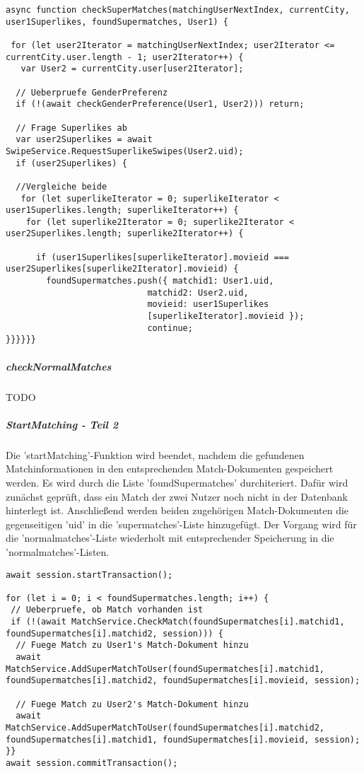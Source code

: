 \begin{lstlisting}[caption=matchManager.js - checkSuperMatches, label=lst:checkSuperMatches]
async function checkSuperMatches(matchingUserNextIndex, currentCity, user1Superlikes, foundSupermatches, User1) {

 for (let user2Iterator = matchingUserNextIndex; user2Iterator <= currentCity.user.length - 1; user2Iterator++) {
   var User2 = currentCity.user[user2Iterator];
   
  // Ueberpruefe GenderPreferenz
  if (!(await checkGenderPreference(User1, User2))) return;
  
  // Frage Superlikes ab
  var user2Superlikes = await SwipeService.RequestSuperlikeSwipes(User2.uid);
  if (user2Superlikes) {
        
  //Vergleiche beide
   for (let superlikeIterator = 0; superlikeIterator < user1Superlikes.length; superlikeIterator++) {
    for (let superlike2Iterator = 0; superlike2Iterator < user2Superlikes.length; superlike2Iterator++) {
    
      if (user1Superlikes[superlikeIterator].movieid === user2Superlikes[superlike2Iterator].movieid) {
        foundSupermatches.push({ matchid1: User1.uid,
                            matchid2: User2.uid, 
                            movieid: user1Superlikes
                            [superlikeIterator].movieid });
                            continue;
}}}}}}
\end{lstlisting}

\noindent
\subparagraph{checkNormalMatches}
TODO

\noindent
\subparagraph{StartMatching - Teil 2}
Die 'startMatching'-Funktion wird beendet, nachdem die gefundenen Matchinformationen in den entsprechenden Match-Dokumenten gespeichert werden. Es wird durch die Liste 'foundSupermatches' durchiteriert. Dafür wird zunächst geprüft, dass ein Match der zwei Nutzer noch nicht in der Datenbank hinterlegt ist. Anschließend werden beiden zugehörigen Match-Dokumenten die gegenseitigen 'uid' in die 'supermatches'-Liste hinzugefügt.
Der Vorgang wird für die 'normalmatches'-Liste wiederholt mit entsprechender Speicherung in die 'normalmatches'-Listen.

\begin{lstlisting}[caption=matchManager.js - startMatching - Teil 2: Speichere Matches, label=lst:startMatchingteil2]
await session.startTransaction();

for (let i = 0; i < foundSupermatches.length; i++) {        
 // Ueberpruefe, ob Match vorhanden ist
 if (!(await MatchService.CheckMatch(foundSupermatches[i].matchid1,   foundSupermatches[i].matchid2, session))) {
  // Fuege Match zu User1's Match-Dokument hinzu
  await MatchService.AddSuperMatchToUser(foundSupermatches[i].matchid1, foundSupermatches[i].matchid2, foundSupermatches[i].movieid, session);

  // Fuege Match zu User2's Match-Dokument hinzu
  await MatchService.AddSuperMatchToUser(foundSupermatches[i].matchid2,  foundSupermatches[i].matchid1, foundSupermatches[i].movieid, session);
}}
await session.commitTransaction();
\end{lstlisting}